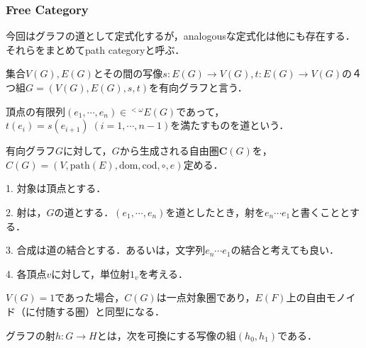 \documentclass[uplatex, 12pt, dvipdfmx]{jsarticle}
\begin{document}
\subsubsection{Free Category}
今回はグラフの道として定式化するが，analogousな定式化は他にも存在する．それらをまとめてpath categoryと呼ぶ．

\begin{definition*}[有向グラフ]
    集合$V(G),E(G)$とその間の写像$s:E(G)\to V(G), t:E(G)\to V(G)$の４つ組$G=(V(G), E(G), s,t)$を有向グラフと言う．
    \begin{center}
    \end{center}

    頂点の有限列$(e_1,\cdots,e_n)\in {}^{<\omega}\! E(G)$であって，$t(e_i)=s(e_{i+1})\; (i=1,\cdots,n-1)$を満たすものを道という．
\end{definition*}

\begin{definition*}[有向グラフ上の自由圏]
    有向グラフ$G$に対して，$G$から生成される自由圏$\mathbf{C}(G)$を，$C(G)=(V, \mathrm{path}(E),\mathrm{dom}, \mathrm{cod}, \circ ,e)$定める．

    \begin{center}
    \end{center}

    1. 対象は頂点とする．

    2. 射は，$G$の道とする．$(e_1, \cdots, e_n)$を道としたとき，射を$e_n\cdots e_1$と書くこととする．

    3. 合成は道の結合とする．あるいは，文字列$e_n\cdots e_1$の結合と考えても良い．

    4. 各頂点$v$に対して，単位射$1_v$を考える．
\end{definition*}
\begin{example*}
    $V(G)=1$であった場合，$C(G)$は一点対象圏であり，$E(F)$上の自由モノイド（に付随する圏）と同型になる．
\end{example*}

\begin{definition*}[有向グラフ準同型]
    グラフの射$h:G\to H$とは，次を可換にする写像の組$(h_0, h_1)$である．
    \begin{center}
    \end{center}
\end{definition*}
\end{document}
